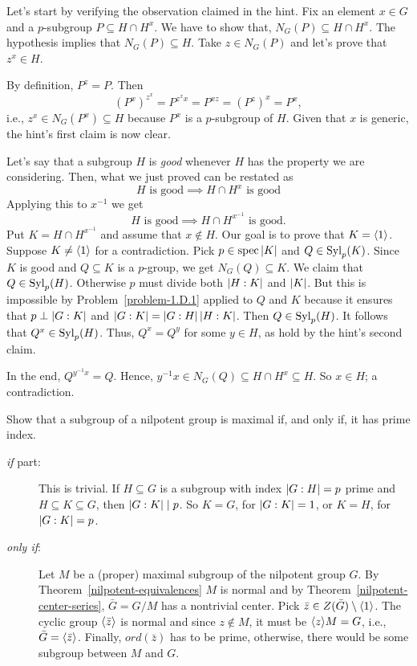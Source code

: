 \begin{solution} Let's start by verifying the observation claimed in the hint. Fix an element $x\in G$ and a $p$-subgroup $P\subseteq H\cap H^x$. We have to show that, $N_G(P)\subseteq H\cap H^x$. The hypothesis implies that $N_G(P)\subseteq H$. Take $z\in N_G(P)$ and let's prove that $z^x\in H$.

By definition, $P^z=P$. Then
$$
    (P^x)^{z^x} = P^{z^xx} = P^{xz} = (P^z)^x = P^x,
$$
i.e., $z^x\in N_G(P^x)\subseteq H$ because $P^x$ is a $p$-subgroup of $H$. Given that $x$ is generic, the hint's first claim is now clear.

Let's say that a subgroup $H$ is \textsl{good\/} whenever $H$ has the property we are considering. Then, what we just proved can be restated as
$$
    H \text{ is good} \implies H\cap H^x\text{ is good}
$$
Applying this to $x^{-1}$ we get
$$
    H \text{ is good} \implies H\cap H^{x^{-1}}\text{ is good}.
$$
Put $K=H\cap H^{x^{-1}}$ and assume that $x\notin H$. Our goal is to prove that $K=\langle1\rangle$. Suppose $K\ne\langle1\rangle$ for a contradiction. Pick $p\in\operatorname{spec}\left\vert{K}\right\vert$ and $Q\in{\rm Syl}_p(K)$. Since $K$ is good and $Q\subseteq K$ is a $p$-group, we get $N_G(Q)\subseteq K$. We claim that $Q\in{\rm Syl}_p(H)$. Otherwise $p$ must divide both $\left\vert{H:K}\right\vert$ and $\left\vert{K}\right\vert$. But this is impossible by Problem~\ref{problem-1.D.1} applied to $Q$ and $K$ because it ensures that $p\perp\left\vert{G:K}\right\vert$ and $\left\vert{G:K}\right\vert=\left\vert{G:H}\right\vert\left\vert{H:K}\right\vert$. Then $Q\in{\rm Syl}_p(H)$. It follows that $Q^x\in{\rm Syl}_p(H)$. Thus, $Q^x=Q^y$ for some $y\in H$, as hold by the hint's second claim.

In the end, $Q^{y^{-1}x}=Q$. Hence, $y^{-1}x\in N_G(Q)\subseteq H\cap H^x\subseteq H$. So $x\in H$; a contradiction.  \end{solution}

\begin{probl}\label{problem-1.D.6}
    Show that a subgroup of a nilpotent group is maximal if, and only if, it has prime index.
\end{probl}

\begin{solution}

\begin{description}%
    \item[\rm{\it if\/} part:] This is trivial. If $H\subseteq G$ is a subgroup with index $\left\vert{G:H}\right\vert=p$ prime and $H\subseteq K\subseteq G$, then $\left\vert{G:K}\right\vert\mid p$. So $K=G$, for $\left\vert{G:K}\right\vert=1$, or $K=H$, for $\left\vert{G:K}\right\vert=p$.
    
    \item[\rm{\it only if\/}:] Let $M$ be a (proper) maximal subgroup of the nilpotent group $G$. By Theorem~\ref{nilpotent-equivalences} $M$ is normal and by Theorem~\ref{nilpotent-center-series}, $\bar G=G/M$ has a nontrivial center. Pick $\bar z\in Z(\bar G)\setminus\langle1\rangle$. The cyclic group $\langle\bar z\rangle$ is normal and since $z\notin M$, it must be $\langle z\rangle M=G$, i.e., $\bar G=\langle\bar z\rangle$. Finally, $ord(\bar z)$ has to be prime, otherwise, there would be some subgroup between $M$ and $G$.
\end{description}
\end{solution}

